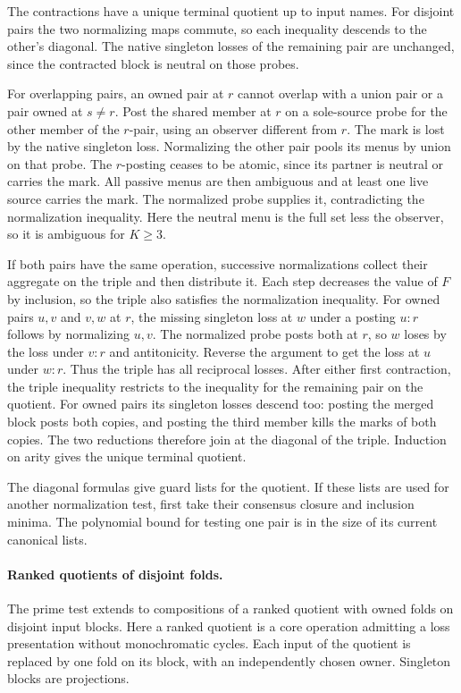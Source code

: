 The contractions have a unique terminal quotient up to
input names. For disjoint pairs the two normalizing maps
commute, so each inequality descends to the other's
diagonal. The native singleton losses of the remaining
pair are unchanged, since the contracted block is neutral
on those probes.

For overlapping pairs, an owned pair at $r$ cannot
overlap with a union pair or a pair owned at $s\ne r$.
Post the shared member at $r$ on a sole-source probe
for the other member of the $r$-pair, using an observer
different from $r$. The mark is lost by the native
singleton loss. Normalizing the other pair pools its
menus by union on that probe. The $r$-posting ceases
to be atomic, since its partner is neutral or carries
the mark. All passive menus are then ambiguous and
at least one live source carries the mark. The
normalized probe supplies it, contradicting the
normalization inequality. Here the neutral menu is
the full set less the observer, so it is ambiguous
for $K\ge3$.

If both pairs have the same operation, successive
normalizations collect their aggregate on the triple
and then distribute it. Each step decreases the
value of $F$ by inclusion, so the triple also
satisfies the normalization inequality. For owned
pairs $u,v$ and $v,w$ at $r$, the missing singleton
loss at $w$ under a posting $u:r$ follows by
normalizing $u,v$. The normalized probe posts
both at $r$, so $w$ loses by the loss under
$v:r$ and antitonicity. Reverse the argument
to get the loss at $u$ under $w:r$. Thus the
triple has all reciprocal losses. After either first
contraction, the triple inequality restricts to the
inequality for the remaining pair on the quotient.
For owned pairs its singleton losses descend too:
posting the merged block posts both copies, and
posting the third member kills the marks of
both copies. The two reductions therefore join at
the diagonal of the triple. Induction on arity
gives the unique terminal quotient.

The diagonal formulas give guard lists for the quotient.
If these lists are used for another normalization test,
first take their consensus closure and inclusion minima.
The polynomial bound for testing one pair is in the size
of its current canonical lists.

\paragraph{Ranked quotients of disjoint folds.}
The prime test extends to compositions of a ranked
quotient with owned folds on disjoint input blocks.
Here a ranked quotient is a core operation admitting
a loss presentation without monochromatic cycles.
Each input of the quotient is replaced by one fold
on its block, with an independently chosen owner.
Singleton blocks are projections.

